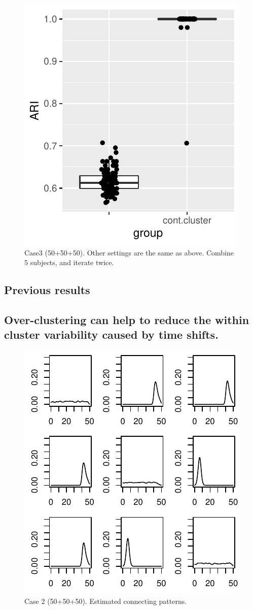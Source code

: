 \begin{figure}[H]
\includegraphics[width=.5\textwidth]{../simulation/plots/case3_cont_cluster}
\caption{Case3 (50+50+50). Other settings are the same as above. Combine 5 subjects, and iterate twice.}
\end{figure}



\subsection{Previous results}

\subsection*{Over-clustering can help to reduce the within cluster variability caused by time shifts.}

\begin{figure}[H]
\includegraphics[width=.6\textwidth]{../simulation/plots/case2_conn_patt_matrix}
\caption{Case 2 (50+50+50). Estimated connecting patterns.}
\end{figure}


